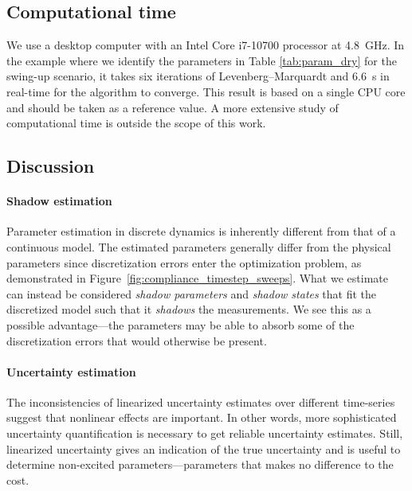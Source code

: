 \documentclass[preprint,12pt]{elsarticle}
\newcommand\figref{Figure~\ref}
\numberwithin{equation}{section}
\begin{document}
\subsection{Computational time}
We use a desktop computer with an Intel Core i7-10700 processor at \SI{4.8}{GHz}.
In the example where we identify the parameters in Table \ref{tab:param_dry} for the swing-up scenario, it takes six iterations of Levenberg--Marquardt and \SI{6.6}{s} in real-time for the algorithm to converge.
This result is based on a single CPU core and should be taken as a reference value.
A more extensive study of computational time is outside the scope of this work.

\subsection{Discussion}
\label{sec:discussion}
\paragraph{Shadow estimation}
Parameter estimation in discrete dynamics is inherently different from that of a continuous model.
The estimated parameters generally differ from the physical parameters since discretization errors enter the optimization problem, as demonstrated in \figref{fig:compliance_timestep_sweeps}.
What we estimate can instead be considered \emph{shadow parameters} and \emph{shadow states} that fit the discretized model such that it \emph{shadows} the measurements.
We see this as a possible advantage---the parameters may be able to absorb some of the discretization errors that would otherwise be present.

\paragraph{Uncertainty estimation}
The inconsistencies of linearized uncertainty estimates over different time-series suggest that nonlinear effects are important.
In other words, more sophisticated uncertainty quantification is necessary to get reliable uncertainty estimates.
Still, linearized uncertainty gives an indication of the true uncertainty and is useful to determine non-excited parameters---parameters that makes no difference to the cost.
\end{document}
